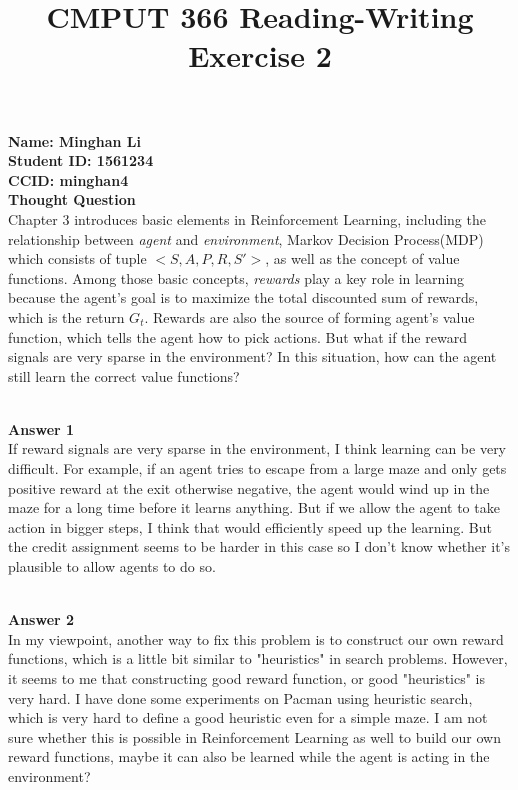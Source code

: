 \documentclass[12pt,a4paper]{article}
\begin{document}
\title{\textbf{CMPUT 366 Reading-Writing Exercise 2}}
\date{}
\maketitle
\noindent \textbf{Name: Minghan Li}\\
\textbf{Student ID: 1561234}\\
\textbf{CCID: minghan4}\\


\noindent \textbf{Thought Question}
\ \\
Chapter 3 introduces basic elements in Reinforcement Learning, including the relationship between \textit{agent} and \textit{environment},  Markov Decision Process(MDP) which consists of tuple $<S, A, P, R, S'>$, as well as the concept of value functions. Among those basic concepts, \textit{rewards} play a key role in learning because the agent's goal is to maximize the total discounted sum of rewards, which is the return $G_{t}$. Rewards are also the source of forming agent's value function, which tells the agent how to pick actions. But what if the reward signals are very sparse in the environment? In this situation, how can the agent still learn the correct value functions?

\ \\
\noindent \textbf{Answer 1}\ \\ 
If reward signals are very sparse in the environment, I think learning can be very difficult. For example, if an agent tries to escape from a large maze and only gets positive reward at the exit otherwise negative, the agent would wind up in the maze for a long time before it learns anything. But if we allow the agent to take action in bigger steps, I think that would efficiently speed up the learning. But the credit assignment seems to be harder in this case so I don't know whether it's plausible to allow agents to do so. 

\ \\
\noindent \textbf{Answer 2} \ \\
In my viewpoint, another way to fix this problem is to construct our own reward functions, which is a little bit similar to "heuristics" in search problems. However, it seems to me that constructing good reward function, or good "heuristics" is very hard. I have done some experiments on Pacman using heuristic search, which is very hard to define a good heuristic even for a simple maze. I am not sure whether this is possible in Reinforcement Learning as well to build our own reward functions, maybe it can also be learned while the agent is acting in the environment?
\end{document}
